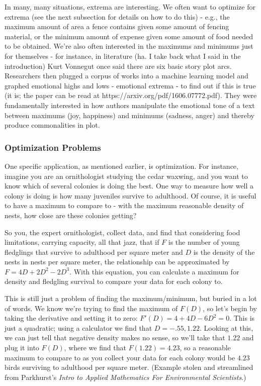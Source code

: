 In many, many situations, extrema are interesting. We often want to optimize for extrema (see the next subsection for details on how to do this) - e.g., the maximum amount of area a fence contains given some amount of fencing material, or the minimum amount of expense given some amount of food needed to be obtained. We're also often interested in the maximums and minimums just for themselves - for instance, in literature (ha. I take back what I said in the introduction) Kurt Vonnegut once said there are six basic story plot arcs. Researchers then plugged a corpus of works into a machine learning model and graphed emotional highs and lows - emotional extrema - to find out if this is true (it is; the paper can be read at https://arxiv.org/pdf/1606.07772.pdf). They were fundamentally interested in how authors manipulate the emotional tone of a text between maximums (joy, happiness) and minimums (sadness, anger) and thereby produce commonalities in plot.

\subsubsection{Optimization Problems}

One specific application, as mentioned earlier, is optimization. For instance, imagine you are an ornithologist studying the cedar waxwing, and you want to know which of several colonies is doing the best. One way to measure how well a colony is doing is how many juveniles survive to adulthood. Of course, it is useful to have a maximum to compare to - with the maximum reasonable density of nests, how close are these colonies getting?

So you, the expert ornithologist, collect data, and find that considering food limitations, carrying capacity, all that jazz, that if $F$ is the number of young fledglings that survive to adulthood per square meter and $D$ is the density of the nests in nests per square meter, the relationship can be approximated by $F = 4D + 2D^2 - 2D^3$. With this equation, you can calculate a maximum for density and fledgling survival to compare your data for each colony to.

This is still just a problem of finding the maximum/minimum, but buried in a lot of words. We know we're trying to find the maximum of $F(D)$, so let's begin by taking the derivative and setting it to zero: $F'(D) = 4 + 4D - 6D^2 = 0$. This is just a quadratic; using a calculator we find that $D = -.55, 1.22$. Looking at this, we can just tell that negative density makes no sense, so we'll take that $1.22$ and plug it into $F(D)$, where we find that $F(1.22) = 4.23$, so a reasonable maximum to compare to as you collect your data for each colony would be $4.23$ birds surviving to adulthood per square meter. (Example stolen and streamlined from Parkhurst's \textit{Intro to Applied Mathematics For Environmental Scientists}.)

